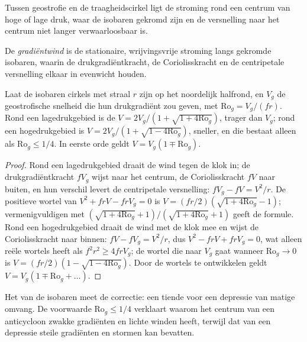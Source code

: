 Tussen geostrofie en de traagheidscirkel ligt de stroming rond een centrum van
hoge of lage druk, waar de isobaren gekromd zijn en de versnelling naar het
centrum niet langer verwaarloosbaar is.

\begin{definition}[Gradiëntwind]\label{def:b3:gfd-foundations:gradient}
De \emph{gradiëntwind} is de stationaire, wrijvingsvrije
stroming langs gekromde isobaren, waarin de drukgradiëntkracht, de
Coriolisskracht en de centripetale versnelling elkaar in evenwicht houden.
\end{definition}

\begin{proposition}[De krommingscorrectie]\label{prop:b3:gfd-foundations:gradient}
Laat de isobaren cirkels met straal $r$ zijn op het noordelijk halfrond, en
$V_g$ de geostrofische snelheid die hun drukgradiënt zou geven, met
$\mathrm{Ro}_g = V_g/(fr)$. Rond een lagedrukgebied is de 
$V = 2V_g/(1 + \sqrt{1 + 4\mathrm{Ro}_g})$, trager dan $V_g$; rond een hogedrukgebied
is $V = 2V_g/(1 + \sqrt{1 - 4\mathrm{Ro}_g})$, sneller, en die bestaat alleen
als $\mathrm{Ro}_g \le 1/4$. In eerste orde geldt $V = V_g(1 \mp \mathrm{Ro}_g)$.
\end{proposition}

\begin{proof}
Rond een lagedrukgebied draait de wind tegen de klok in; de drukgradiëntkracht
$fV_g$ wijst naar het centrum, de Coriolisskracht $fV$ naar buiten, en hun
verschil levert de centripetale versnelling: $fV_g - fV = V^2/r$. De positieve
wortel van $V^2 + frV - frV_g = 0$ is $V = (fr/2)(\sqrt{1 +
4\mathrm{Ro}_g} - 1)$; vermenigvuldigen met $(\sqrt{1 + 4\mathrm{Ro}_g} +
1)/(\sqrt{1 + 4\mathrm{Ro}_g} + 1)$ geeft de formule. Rond een hogedrukgebied
draait de wind met de klok mee en wijst de Coriolisskracht naar binnen: $fV - fV_g =
V^2/r$, dus $V^2 - frV + frV_g = 0$, wat alleen reële wortels heeft als $f^2r^2
\ge 4frV_g$; de wortel die naar $V_g$ gaat wanneer $\mathrm{Ro}_g \to 0$ is
$V = (fr/2)(1 - \sqrt{1 - 4\mathrm{Ro}_g})$. Door de wortels te ontwikkelen
geldt $V = V_g(1 \mp \mathrm{Ro}_g + \dots)$.
\end{proof}

Het  van de isobaren meet de correctie: een tiende voor een
depressie van matige omvang. De voorwaarde $\mathrm{Ro}_g \le 1/4$ verklaart waarom het
centrum van een anticycloon zwakke gradiënten en lichte winden heeft, terwijl dat
van een depressie steile gradiënten en stormen kan bevatten.

